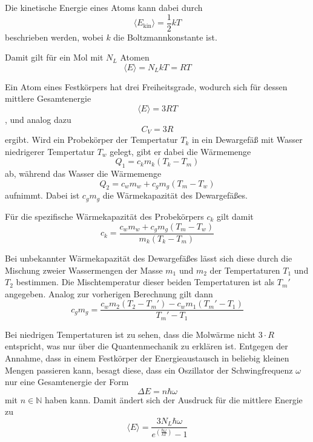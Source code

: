 Die kinetische Energie eines Atoms kann dabei durch 
\begin{equation}
    \langle E_\text{kin} \rangle = \frac{1}2 k T
\end{equation}
beschrieben werden, wobei $k$ die Boltzmannkonstante ist.

Damit gilt für ein Mol mit $N_L$ Atomen 
\begin{equation}
    \langle E \rangle = N_L k T = R T 
\end{equation}

Ein Atom eines Festkörpers hat drei Freiheitsgrade, wodurch sich für dessen mittlere Gesamtenergie 
\begin{equation}
    \langle E \rangle = 3 R T 
\end{equation},
und analog dazu 
\begin{equation}
    C_V = 3 R
\end{equation}
ergibt.
Wird ein Probekörper der Tempertatur $T_k$ in ein Dewargefäß mit Wasser niedrigerer Tempertatur $T_w$ gelegt, gibt er 
dabei die Wärmemenge 
\begin{equation}
    Q_1 = c_k m_k (T_k - T_m)
\end{equation}
ab, während das Wasser die Wärmemenge 
\begin{equation}
    Q_2 = c_w m_w + c_g m_g (T_m - T_w)
\end{equation}
aufnimmt.
Dabei ist $c_g m_g$ die Wärmekapazität des Dewargefäßes.

Für die spezifische Wärmekapazität des Probekörpers $c_k$ gilt damit 
\begin{equation}
    c_k = \frac{c_w m_w + c_g m_g (T_m - T_w)}{m_k (T_k - T_m)}
    \label{eqn:c_k}
\end{equation}

Bei unbekannter Wärmekapazität des Dewargefäßes lässt sich diese durch die Mischung zweier Wassermengen der Masse $m_1$ und $m_2$
der Tempertaturen $T_1$ und $T_2$ bestimmen. Die Mischtemperatur dieser beiden Tempertaturen ist als $T_m'$ angegeben.
Analog zur vorherigen Berechnung gilt dann
\begin{equation}
    c_g m_g = \frac{c_w m_2 (T_2 - T_m') - c_w m_1 (T_m' - T_1)}{T_m' - T_1} 
    \label{eqn:c_g}
\end{equation}


Bei niedrigen Tempertaturen ist zu sehen, dass die Molwärme nicht $3\cdot R$ entspricht, was nur über die Quantenmechanik zu 
erklären ist. Entgegen der Annahme, dass in einem Festkörper der Energieaustausch in beliebig kleinen Mengen passieren kann, besagt
diese, dass ein Oszillator der Schwingfrequenz $\omega$ nur eine Gesamtenergie der Form 
\begin{equation}
    \Delta E = n \hbar \omega 
\end{equation}
mit $n \in \mathds{N}$ haben kann. Damit ändert sich der Ausdruck für die mittlere Energie zu 
\begin{equation}
    \langle E \rangle = \frac{3 N_L \hbar \omega}{e^{(\frac{\hbar \omega}{k T})}-1}
\end{equation}

